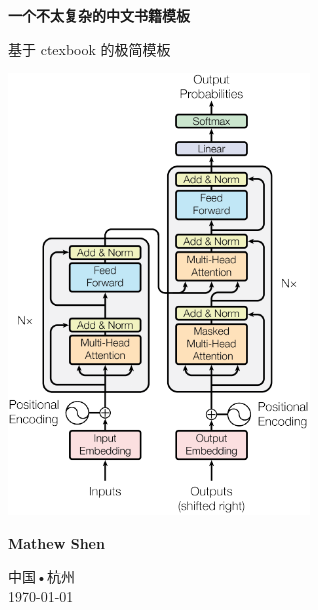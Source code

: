 \documentclass{ctexbook}
\begin{document}
\frontmatter
\begin{titlepage}
    \begin{center}
        \vspace*{1cm}
 
        \textbf{一个不太复杂的中文书籍模板}
 
        \vspace{0.5cm}
         基于 ctexbook 的极简模板
             
        \vspace{0.5cm}
 
        \includegraphics[width=0.6\textwidth]{./figures/transformer.pdf}

        \vfill

        \textbf{Mathew Shen}
        \vspace{1cm}
      
        中国•杭州\\
        \today

    \end{center}
 \end{titlepage}


\tableofcontents
\setcounter{tocdepth}{2}




\mainmatter






\backmatter




\printbibliography[title={参考文献}, heading=bibintoc]

\printindex

\end{document}
